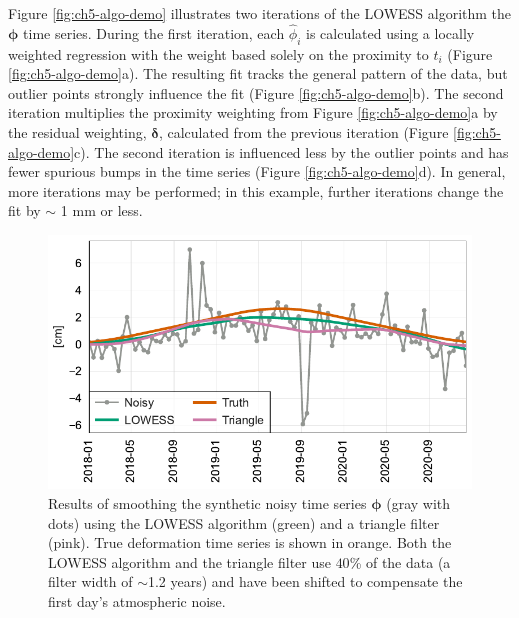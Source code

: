 Figure \ref{fig:ch5-algo-demo} illustrates two iterations of the LOWESS algorithm the $ \bm{\phi} $ time series.
During the first iteration, each $ \hat{\phi}_i $ is calculated using a locally weighted regression with the weight based solely on the proximity to $ t_i $ (Figure \ref{fig:ch5-algo-demo}a). The resulting fit tracks the general pattern of the data, but outlier points strongly influence the fit (Figure \ref{fig:ch5-algo-demo}b). 
The second iteration multiplies the proximity weighting from Figure \ref{fig:ch5-algo-demo}a by the residual weighting, $ \bm{\delta} $, calculated from the previous iteration (Figure \ref{fig:ch5-algo-demo}c).
The second iteration is influenced less by the outlier points and has fewer spurious bumps in the time series (Figure \ref{fig:ch5-algo-demo}d). In general, more iterations may be performed; in this example, further iterations change the fit by $ \sim $ 1 mm or less.



\begin{figure}[!h]
	\centering
	\includegraphics[width=.75\textwidth]{figures/chapter5-lowess/figure4-compare-tri-ts-only.pdf}
	\caption[Comparison of LOWESS smoothing to triangle filter for synthetic data]{
		Results of smoothing the synthetic noisy time series $ \bm{\phi} $ (gray with dots) using the LOWESS algorithm (green) and a triangle filter (pink). True deformation time series is shown in orange. Both the LOWESS algorithm and the triangle filter use $ 40 $\% of the data (a filter width of $ \sim $1.2 years) and have been shifted to compensate the first day's atmospheric noise.
}
	\label{fig:ch5-compare-tri}
\end{figure}

